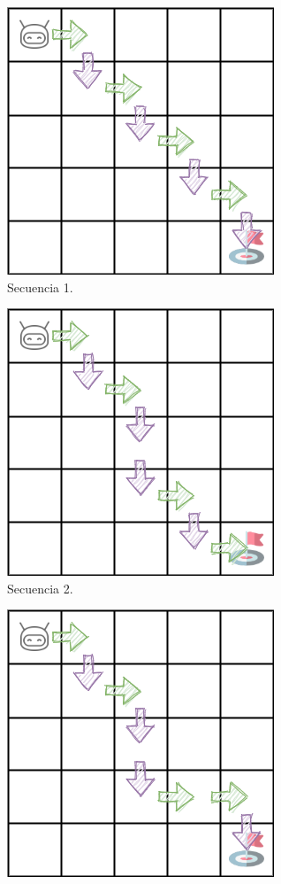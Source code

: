 \begin{figure}
    \centering
    \begin{subfigure}{.35\textwidth}
        \centering
        \includegraphics[scale=0.4]{cap5_experimentacion/images/dim5_actions_5.png}
        \caption{Secuencia 1.}
        \label{fig:seq1}
    \end{subfigure}%
    \begin{subfigure}{.35\textwidth}
        \centering
        \includegraphics[scale=0.4]{cap5_experimentacion/images/dim5_lr0.01_ep0.7_139.png}
        \caption{Secuencia 2.}
        \label{fig:seq2}
    \end{subfigure}%
    \begin{subfigure}{.35\textwidth}
        \centering
        \includegraphics[scale=0.4]{cap5_experimentacion/images/dim5_lr0.01_ep0.7_7.png}

\end{subfigure}
\end{figure}
